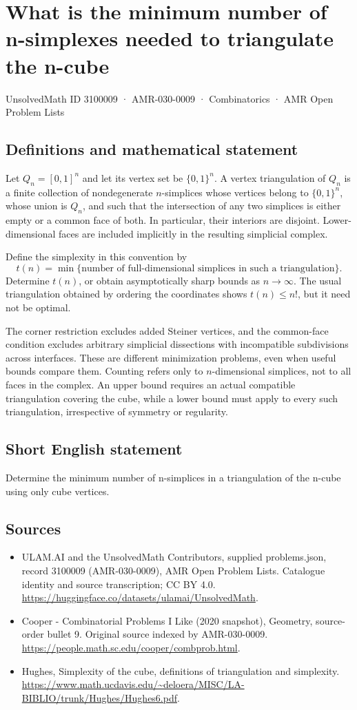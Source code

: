 \documentclass[11pt,a4paper]{article}
\begin{document}
\section*{What is the minimum number of n-simplexes needed to triangulate the n-cube}\label{3100009}
{\small UnsolvedMath ID 3100009 · AMR-030-0009 · Combinatorics · AMR Open Problem Lists}
\subsection{Definitions and mathematical statement}
Let $Q_n=[0,1]^n$ and let its vertex set be $\{0,1\}^n$.
A vertex triangulation of $Q_n$ is a finite collection of
nondegenerate $n$-simplices whose vertices belong to $\{0,1\}^n$,
whose union is $Q_n$, and such that the intersection of any two
simplices is either empty or a common face of both. In particular,
their interiors are disjoint. Lower-dimensional faces are included
implicitly in the resulting simplicial complex.

Define the simplexity in this convention by
\[
 t(n)=\min\{\text{number of full-dimensional simplices in such a
 triangulation}\}.
\]
Determine $t(n)$, or obtain asymptotically sharp bounds as
$n\to\infty$. The usual triangulation obtained by ordering the
coordinates shows $t(n)\le n!$, but it need not be optimal.

The corner restriction excludes added Steiner vertices, and the
common-face condition excludes arbitrary simplicial dissections
with incompatible subdivisions across interfaces. These are
different minimization problems, even when useful bounds compare
them. Counting refers only to $n$-dimensional simplices, not to all
faces in the complex. An upper bound requires an actual compatible
triangulation covering the cube, while a lower bound must apply to
every such triangulation, irrespective of symmetry or regularity.
\subsection{Short English statement}
Determine the minimum number of n-simplices in a triangulation of the n-cube using only cube vertices.
\subsection{Sources}
\begin{itemize}
\item[S1] ULAM.AI and the UnsolvedMath Contributors, supplied problems.json, record 3100009 (AMR-030-0009), AMR Open Problem Lists. Catalogue identity and source transcription; CC BY 4.0.
\url{https://huggingface.co/datasets/ulamai/UnsolvedMath}.
\item[S2] Cooper - Combinatorial Problems I Like (2020 snapshot), Geometry, source-order bullet 9. Original source indexed by AMR-030-0009.
\url{https://people.math.sc.edu/cooper/combprob.html}.
\item[S3] Hughes, Simplexity of the cube, definitions of triangulation and simplexity.
\url{https://www.math.ucdavis.edu/~deloera/MISC/LA-BIBLIO/trunk/Hughes/Hughes6.pdf}.
\end{itemize}
\end{document}
